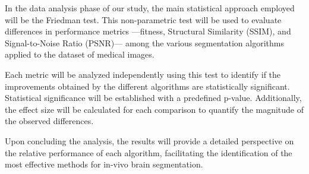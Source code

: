 \documentclass{elsarticle}
\begin{document}
\noindent In the data analysis phase of our study, the main statistical approach employed will be the Friedman test. This non-parametric test will be used to evaluate differences in performance metrics —fitness, Structural Similarity (SSIM), and Signal-to-Noise Ratio (PSNR)— among the various segmentation algorithms applied to the dataset of medical images.

\noindent Each metric will be analyzed independently using this test to identify if the improvements obtained by the different algorithms are statistically significant. Statistical significance will be established with a predefined p-value. Additionally, the effect size will be calculated for each comparison to quantify the magnitude of the observed differences.

\noindent Upon concluding the analysis, the results will provide a detailed perspective on the relative performance of each algorithm, facilitating the identification of the most effective methods for in-vivo brain segmentation.



\end{document}
